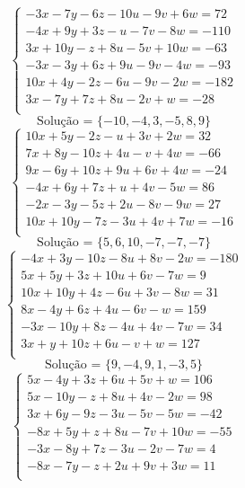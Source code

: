 \documentclass[12pt,oneside,a4paper]{article}
\begin{document}
\vspace{\baselineskip}
\begin{equation*}
\begin{cases}
-3x-7y-6z-10u-9v+6w=72 \\
-4x+9y+3z-u-7v-8w=-110 \\
3x+10y-z+8u-5v+10w=-63 \\
-3x-3y+6z+9u-9v-4w=-93 \\
10x+4y-2z-6u-9v-2w=-182 \\
3x-7y+7z+8u-2v+w=-28 \\
\end{cases}
\end{equation*}
\begin{equation*}
\text{Solução = }\{-10,-4,3,-5,8,9\}
\end{equation*}
\vspace{\baselineskip}
\begin{equation*}
\begin{cases}
10x+5y-2z-u+3v+2w=32 \\
7x+8y-10z+4u-v+4w=-66 \\
9x-6y+10z+9u+6v+4w=-24 \\
-4x+6y+7z+u+4v-5w=86 \\
-2x-3y-5z+2u-8v-9w=27 \\
10x+10y-7z-3u+4v+7w=-16 \\
\end{cases}
\end{equation*}
\begin{equation*}
\text{Solução = }\{5,6,10,-7,-7,-7\}
\end{equation*}
\vspace{\baselineskip}
\begin{equation*}
\begin{cases}
-4x+3y-10z-8u+8v-2w=-180 \\
5x+5y+3z+10u+6v-7w=9 \\
10x+10y+4z-6u+3v-8w=31 \\
8x-4y+6z+4u-6v-w=159 \\
-3x-10y+8z-4u+4v-7w=34 \\
3x+y+10z+6u-v+w=127 \\
\end{cases}
\end{equation*}
\begin{equation*}
\text{Solução = }\{9,-4,9,1,-3,5\}
\end{equation*}
\vspace{\baselineskip}
\begin{equation*}
\begin{cases}
5x-4y+3z+6u+5v+w=106 \\
5x-10y-z+8u+4v-2w=98 \\
3x+6y-9z-3u-5v-5w=-42 \\
-8x+5y+z+8u-7v+10w=-55 \\
-3x-8y+7z-3u-2v-7w=4 \\
-8x-7y-z+2u+9v+3w=11 \\
\end{cases}
\end{equation*}
\end{document}
